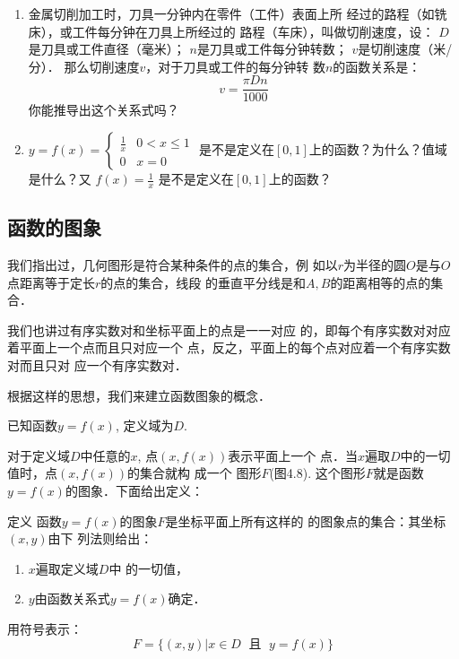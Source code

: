 \begin{enumerate}
\item 金属切削加工时，刀具一分钟内在零件（工件）表面上所
经过的路程（如铣床），或工件每分钟在刀具上所经过的
路程（车床），叫做切削速度，设：
$D$是刀具或工件直径（毫米）；
$n$是刀具或工件每分钟转数；
$v$是切削速度（米/分）．
那么切削速度$v$，对于刀具或工件的每分钟转
数$n$的函数关系是：
\[v=\frac{\pi Dn}{1000}\]
你能推导出这个关系式吗？
\item $y=f(x)=\begin{cases}
    \frac{1}{x} & 0<x\le 1\\ 0& x=0
\end{cases}$
是不是定义在$[0,1]$上的函数？为什么？值域是什么？又
$f(x)=\frac{1}{x}$
是不是定义在$[0,1]$上的函数？
\end{enumerate}

\subsection{函数的图象}
我们指出过，几何图形是符合某种条件的点的集合，例
如以$r$为半径的圆$O$是与$O$点距离等于定长$r$的点的集合，线段
的垂直平分线是和$A,B$的距离相等的点的集合．

我们也讲过有序实数对和坐标平面上的点是一一对应
的，即每个有序实数对对应着平面上一个点而且只对应一个
点，反之，平面上的每个点对应着一个有序实数对而且只对
应一个有序实数对．

根据这样的思想，我们来建立函数图象的概念．

已知函数$y=f(x)$, 定义域为$D$.
\begin{figure}[htp]
    \centering
{}
    \caption{}
\end{figure}


对于定义域$D$中任意的$x$, 点$(x,f(x))$表示平面上一个
点．当$x$遍取$D$中的一切值时，点$(x,f(x))$的集合就构 成一个
图形$F$(图4.8). 这个图形$F$就是函数$y=f(x)$的图象．下面给出定义：

\begin{blk}{定义}
函数$y=f(x)$的图象$F$是坐标平面上所有这样的
的图象点的集合：其坐标$(x,y)$由下
列法则给出：
\begin{enumerate}
    \item $x$遍取定义域$D$中
的一切值，
\item $y$由函数关系式$y=f(x)$确定．
\end{enumerate}
用符号表示：
\[F=\{(x,y)|x\in D\; \text{ 且 }\; y=f(x)\}\]    
\end{blk}


